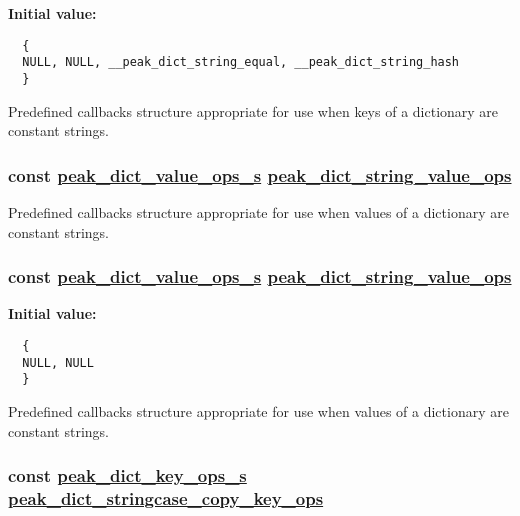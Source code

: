 {\bf Initial value:}

\footnotesize\begin{verbatim}
  {
  NULL, NULL, __peak_dict_string_equal, __peak_dict_string_hash
  }
\end{verbatim}\normalsize 
Predefined callbacks structure appropriate for use when keys of a dictionary are constant strings. \hypertarget{group__dict_ga18}{
\subsubsection[peak\_\-dict\_\-string\_\-value\_\-ops]{\setlength{\rightskip}{0pt plus 5cm}const \hyperlink{structpeak__dict__value__ops__s}{peak\_\-dict\_\-value\_\-ops\_\-s} \hyperlink{group__dict_ga18}{peak\_\-dict\_\-string\_\-value\_\-ops}}}
\label{group__dict_ga18}


Predefined callbacks structure appropriate for use when values of a dictionary are constant strings. \hypertarget{group__dict_ga17}{
\subsubsection[peak\_\-dict\_\-string\_\-value\_\-ops]{\setlength{\rightskip}{0pt plus 5cm}const \hyperlink{structpeak__dict__value__ops__s}{peak\_\-dict\_\-value\_\-ops\_\-s} \hyperlink{group__dict_ga18}{peak\_\-dict\_\-string\_\-value\_\-ops}}}
\label{group__dict_ga17}


{\bf Initial value:}

\footnotesize\begin{verbatim}
  {
  NULL, NULL
  }
\end{verbatim}\normalsize 
Predefined callbacks structure appropriate for use when values of a dictionary are constant strings. \hypertarget{group__dict_ga14}{
\subsubsection[peak\_\-dict\_\-stringcase\_\-copy\_\-key\_\-ops]{\setlength{\rightskip}{0pt plus 5cm}const \hyperlink{structpeak__dict__key__ops__s}{peak\_\-dict\_\-key\_\-ops\_\-s} \hyperlink{group__dict_ga14}{peak\_\-dict\_\-stringcase\_\-copy\_\-key\_\-ops}}}
\label{group__dict_ga14}


